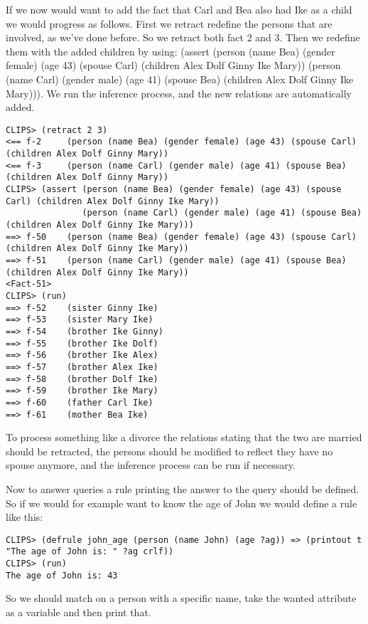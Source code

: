 \documentclass[a4paper]{article}
\begin{document}
If we now would want to add the fact that Carl and Bea also had Ike as a child we would progress as follows. First we retract redefine the persons that are involved, as we've done before. So we retract both fact 2 and 3. Then we redefine them with the added children by using: (assert (person (name Bea) (gender female) (age 43) (spouse Carl) (children Alex Dolf Ginny Ike Mary)) (person (name Carl) (gender male) (age 41) (spouse Bea) (children Alex Dolf Ginny Ike Mary))). We run the inference process, and the new relations are automatically added. 
\begin{Verbatim}[fontsize=\scriptsize]
CLIPS> (retract 2 3)
<== f-2     (person (name Bea) (gender female) (age 43) (spouse Carl) (children Alex Dolf Ginny Mary))
<== f-3     (person (name Carl) (gender male) (age 41) (spouse Bea) (children Alex Dolf Ginny Mary))
CLIPS> (assert (person (name Bea) (gender female) (age 43) (spouse Carl) (children Alex Dolf Ginny Ike Mary)) 
               (person (name Carl) (gender male) (age 41) (spouse Bea) (children Alex Dolf Ginny Ike Mary)))
==> f-50    (person (name Bea) (gender female) (age 43) (spouse Carl) (children Alex Dolf Ginny Ike Mary))
==> f-51    (person (name Carl) (gender male) (age 41) (spouse Bea) (children Alex Dolf Ginny Ike Mary))
<Fact-51>
CLIPS> (run)
==> f-52    (sister Ginny Ike)
==> f-53    (sister Mary Ike)
==> f-54    (brother Ike Ginny)
==> f-55    (brother Ike Dolf)
==> f-56    (brother Ike Alex)
==> f-57    (brother Alex Ike)
==> f-58    (brother Dolf Ike)
==> f-59    (brother Ike Mary)
==> f-60    (father Carl Ike)
==> f-61    (mother Bea Ike)
\end{Verbatim}
To process something like a divorce the relations stating that the two are married should be retracted, the persons should be modified to reflect they have no spouse anymore, and the inference process can be run if necessary.

Now to answer queries a rule printing the answer to the query should be defined. So if we would for example want to know the age of John we would define a rule like this:
\begin{Verbatim}[fontsize=\scriptsize]
CLIPS> (defrule john_age (person (name John) (age ?ag)) => (printout t "The age of John is: " ?ag crlf))
CLIPS> (run)
The age of John is: 43
\end{Verbatim}
So we should match on a person with a specific name, take the wanted attribute as a variable and then print that. 
\end{document}
